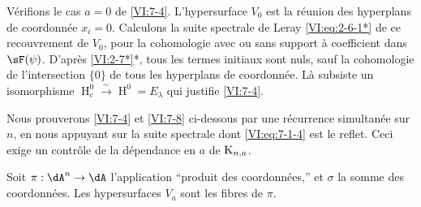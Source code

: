 \documentclass[oneside]{book}
\DeclareMathOperator{\h}{H}
\newcommand{\iso}{\xrightarrow\sim}
\newcommand{\kloos}{\textnormal{K}} %
\theoremstyle{sga-source}
\theoremstyle{sga-source-dash}
\theoremstyle{sga-source-dotdash}
\theoremstyle{sga-source-number-note-dash}
\theoremstyle{sga-source-note-number-dotdash}
\theoremstyle{sga-source-example-dotdash}
\theoremstyle{sga-source-inline-number}
\theoremstyle{sga-source-bare-number}
\theoremstyle{sga-source}
\begin{document}
Vérifions le cas $a=0$ de \ref{VI:7-4}. L'hypersurface $V_0$ est la réunion 
des hyperplans de coordonnée $x_i=0$. Calculons la suite spectrale de Leray 
\eqref{VI:eq:2-6-1*} de ce recouvrement de $V_0$, pour la cohomologie avec ou 
sans support à coefficient dans $\sF(\psi)$. D'après \ref{VI:2-7*}*, tous 
les termes initiaux sont nuls, sauf la cohomologie de l'intersection $\{0\}$ de 
tous les hyperplans de coordonnée. Là subsiste un isomorphisme 
$\h_c^0{}\iso \h^0{}=E_\lambda$ qui justifie \ref{VI:7-4}. 

Nous prouverons \ref{VI:7-4} et \ref{VI:7-8} ci-dessous par une récurrence 
simultanée sur $n$, en nous appuyant sur la suite spectrale dont 
\eqref{VI:eq:7-1-4} est le reflet. Ceci exige un contrôle de la dépendance 
en $a$ de $\kloos_{n,a}$. 

Soit $\pi:\dA^n \to \dA$ l'application ``produit des coordonnées,'' et 
$\sigma$ la somme des coordonnées. Les hypersurfaces $V_a$ sont les fibres de 
$\pi$. 
\end{document}
